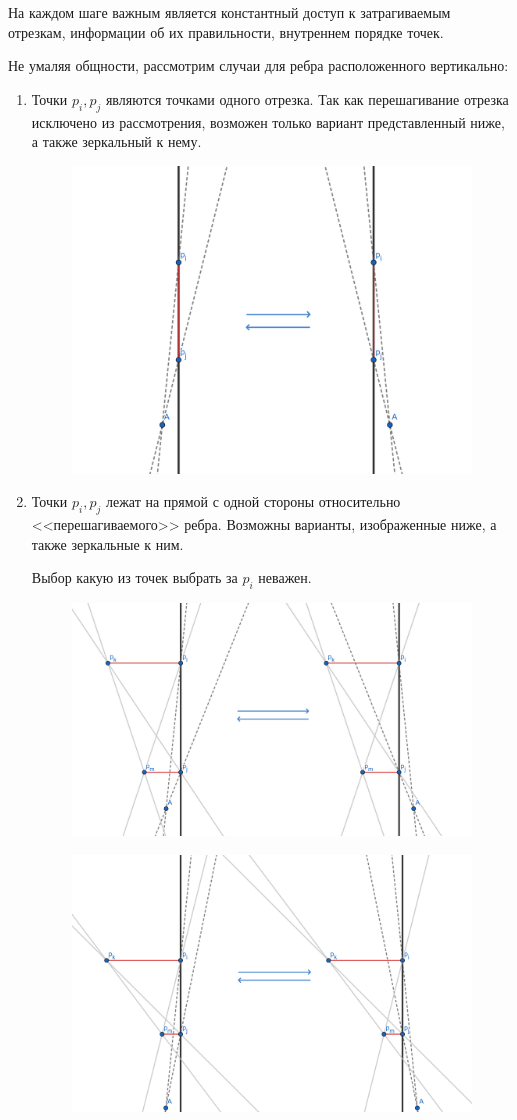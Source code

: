 \documentclass[letterpaper,12pt]{article}
\begin{document}
На каждом шаге важным является константный доступ к затрагиваемым
отрезкам, информации об их правильности, внутреннем порядке точек.

Не умаляя общности, рассмотрим случаи для ребра расположенного вертикально:
\begin{enumerate}
      \item Точки $p_i, p_j$ являются точками одного отрезка. 
            Так как перешагивание отрезка исключено из рассмотрения,
            возможен только вариант представленный ниже, а также
            зеркальный к нему.

            \begin{figure}[h]
                  \centering
                  \includegraphics[width=.5\linewidth]{one_segment_1.png}
            \end{figure}

      \item Точки $p_i, p_j$ лежат на прямой с одной стороны относительно
            <<перешагиваемого>> ребра. Возможны варианты, изображенные ниже,
            а также зеркальные к ним.

            Выбор какую из точек выбрать за $p_i$ неважен.

            \begin{figure}[H]
                  \centering
                  \includegraphics[width=.6\linewidth]{one_side_1.png}
            \end{figure}

            \begin{figure}[H]
                  \centering
                  \includegraphics[width=.6\linewidth]{one_side_3.png}
            \end{figure}


\end{enumerate}
\end{document}

